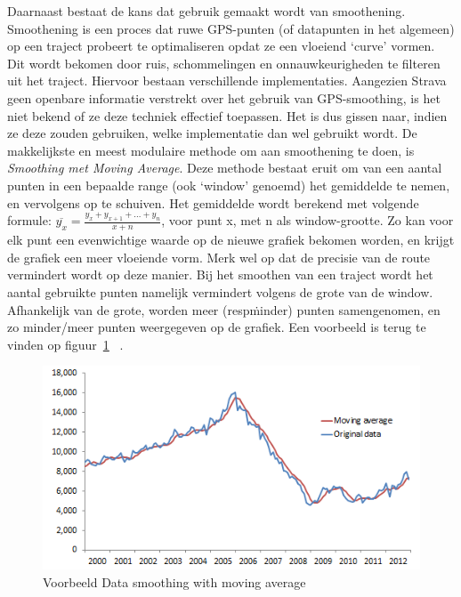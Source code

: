 Daarnaast bestaat de kans dat gebruik gemaakt wordt van smoothening.
Smoothening is een proces dat ruwe GPS-punten (of datapunten in het algemeen)
op een traject probeert te optimaliseren opdat ze een vloeiend `curve' vormen.
Dit wordt bekomen door ruis, schommelingen en onnauwkeurigheden te filteren uit
het traject. Hiervoor bestaan verschillende implementaties. Aangezien Strava
geen openbare informatie verstrekt over het gebruik van GPS-smoothing, is het
niet bekend of ze deze techniek effectief toepassen. Het is dus gissen naar,
indien ze deze zouden gebruiken, welke implementatie dan wel gebruikt wordt. De
makkelijkste en meest modulaire methode om aan smoothening te doen, is
\textit{Smoothing met Moving Average}. Deze methode bestaat eruit om van een
aantal punten in een bepaalde range (ook `window' genoemd) het gemiddelde te
nemen, en vervolgens op te schuiven. Het gemiddelde wordt berekend met volgende
formule: $\overline{y_x} = \frac{y_x + y_{x+1} + \ldots + y_{n}}{x+n}$, voor
punt x, met n als window-grootte. Zo kan voor elk punt een evenwichtige waarde
op de nieuwe grafiek bekomen worden, en krijgt de grafiek een meer vloeiende
vorm. Merk wel op dat de precisie van de route vermindert wordt op deze manier.
Bij het smoothen van een traject wordt het aantal gebruikte punten namelijk
vermindert volgens de grote van de window. Afhankelijk van de grote, worden
meer (resp\. minder) punten samengenomen, en zo minder/meer punten weergegeven
op de grafiek. Een voorbeeld is terug te vinden op
figuur~\ref{fig:SmoothingExample}
~\cite{Smoothin16:online}\cite{SmoothingandInterpolatingNoisyGPSDatawithSmoothingSplines}\cite{Smoothin86:online}.
\begin{figure}[h]
    \centering
    \includegraphics[width=0.6\linewidth]{fig/SmoothingExample.png}
    \caption{Voorbeeld Data smoothing with moving average}\label{fig:SmoothingExample}
\end{figure}

